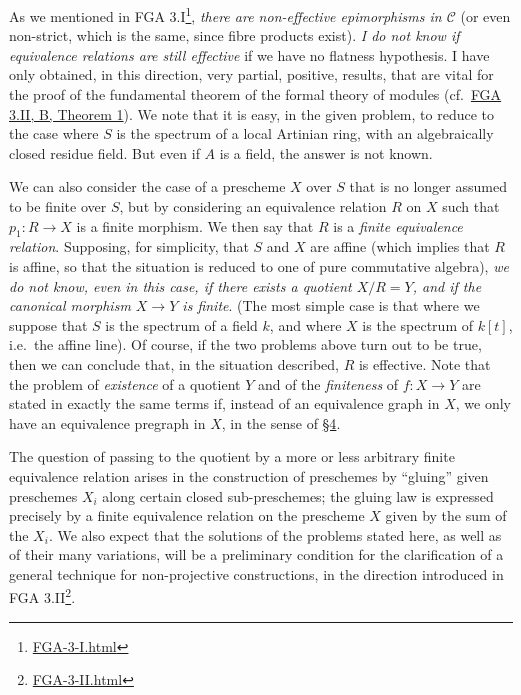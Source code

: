 \documentclass{article}
\renewcommand{\href}[2]{#2\footnote{\url{#1}}}
\newcommand{\oldpage}[1]{\marginpar{\footnotesize$\Big\vert$ \textit{p.~#1}}}
\theoremstyle{definition}
\theoremstyle{definition}
\theoremstyle{definition}
\theoremstyle{definition}
\theoremstyle{remark}
\begin{document}
\oldpage{212-05}As we mentioned in \href{FGA-3-I.html}{FGA 3.I}, \emph{there are non-effective epimorphisms in \({\mathcal{C}}\)} (or even non-strict, which is the same, since fibre products exist).
\emph{I do not know if equivalence relations are still effective} if we have no flatness hypothesis.
I have only obtained, in this direction, very partial, positive, results, that are vital for the proof of the fundamental theorem of the formal theory of modules (cf.~\protect\hyperlink{fga-3-ii-section-B-theorem-1}{FGA 3.II, B, Theorem 1}).
We note that it is easy, in the given problem, to reduce to the case where \(S\) is the spectrum of a local Artinian ring, with an algebraically closed residue field.
But even if \(A\) is a field, the answer is not known.

We can also consider the case of a prescheme \(X\) over \(S\) that is no longer assumed to be finite over \(S\), but by considering an equivalence relation \(R\) on \(X\) such that \(p_1\colon R\to X\) is a finite morphism.
We then say that \(R\) is a \emph{finite equivalence relation}.
Supposing, for simplicity, that \(S\) and \(X\) are affine (which implies that \(R\) is affine, so that the situation is reduced to one of pure commutative algebra), \emph{we do not know, even in this case, if there exists a quotient \(X/R=Y\), and if the canonical morphism \(X\to Y\) is finite}.
(The most simple case is that where we suppose that \(S\) is the spectrum of a field \(k\), and where \(X\) is the spectrum of \(k[t]\), i.e.~the affine line).
Of course, if the two problems above turn out to be true, then we can conclude that, in the situation described, \(R\) is effective.
Note that the problem of \emph{existence} of a quotient \(Y\) and of the \emph{finiteness} of \(f\colon X\to Y\) are stated in exactly the same terms if, instead of an equivalence graph in \(X\), we only have an equivalence pregraph in \(X\), in the sense of \protect\hyperlink{fga-3-iii-section-4}{§4}.

The question of passing to the quotient by a more or less arbitrary finite equivalence relation arises in the construction of preschemes by ``gluing'' given preschemes \(X_i\) along certain closed sub-preschemes;
the gluing law is expressed precisely by a finite equivalence relation on the prescheme \(X\) given by the sum of the \(X_i\).
We also expect that the solutions of the problems stated here, as well as of their many variations, will be a preliminary condition for the clarification of a general technique for non-projective constructions, in the direction introduced in \href{FGA-3-II.html}{FGA 3.II}.
\end{document}
